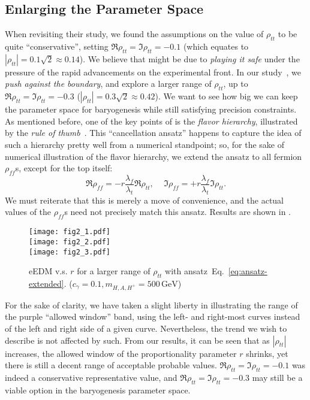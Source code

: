 \subsection{Enlarging the Parameter Space}
When revisiting their study, we found the assumptions on the value of \(\rho_{tt} \) to be quite ``conservative'', setting \(\Re\rho_{tt} = \Im\rho_{tt} = -0.1 \) (which equates to \(|\rho_{tt}| = 0.1\sqrt{2} \approx 0.14\)).
We believe that might be due to \textit{playing it safe} under the pressure of the rapid advancements on the experimental front. 
In our study~\cite{HKT2024eEDMnEDM}, we \textit{push against the boundary}, and explore a larger range of \(\rho_{tt} \), up to \(\Re\rho_{tt} = \Im\rho_{tt} = -0.3 \) (\(|\rho_{tt}| = 0.3\sqrt{2} \approx 0.42\)). 
We want to see how big we can keep the parameter space for baryogenesis while still satisfying precision constraints.
As mentioned before, one of the key points of {\gthdm} is the \textit{flavor hierarchy}, illustrated by the \textit{rule of thumb}~.
This ``cancellation ansatz'' happens to capture the idea of such a hierarchy pretty well from a numerical standpoint; 
so, for the sake of numerical illustration of the flavor hierarchy, we extend the ansatz to all fermion \(\rho_{ff} \)s, except for the top itself:
\begin{equation}\label{eq:ansatz-extended}
    \Re\rho_{ff} = -r\frac{\lambda_{f}}{\lambda_{t}}\Re\rho_{tt} \text{, } \quad \Im\rho_{ff} = +r\frac{\lambda_{f}}{\lambda_{t}}\Im\rho_{tt}.
\end{equation}
We must reiterate that this is merely a move of convenience, and the actual values of the \(\rho_{ff} \)s need not precisely match this ansatz.
Results are shown in .

\begin{figure}[p]
    \centering
    \texttt{[image: fig2\_1.pdf]}\\
    \texttt{[image: fig2\_2.pdf]}\\
    \texttt{[image: fig2\_3.pdf]}
    \caption{eEDM v.s. \(r \) for a larger range of \(\rho_{tt} \) with ansatz~Eq.~\eqref{eq:ansatz-extended}. (\(c_{\gamma} = 0.1, m_{H, A, H^+} = 500\,\mathrm{GeV} \))}
    \label{fig:eEDM}
\end{figure}

For the sake of clarity, we have taken a slight liberty in illustrating the range of the purple ``allowed window'' band,
using the left- and right-most curves instead of the left and right side of a given curve.
Nevertheless, the trend we wish to describe is not affected by such.
From our results, it can be seen that as \(|\rho_{tt}| \) increases, the allowed window of the proportionality parameter \(r \) shrinks, yet there is still a decent range of acceptable probable values.
\(\Re\rho_{tt} = \Im\rho_{tt} = -0.1 \) was indeed a conservative representative value, and \(\Re\rho_{tt} = \Im\rho_{tt} = -0.3 \) may still be a viable option in the baryogenesis parameter space.

